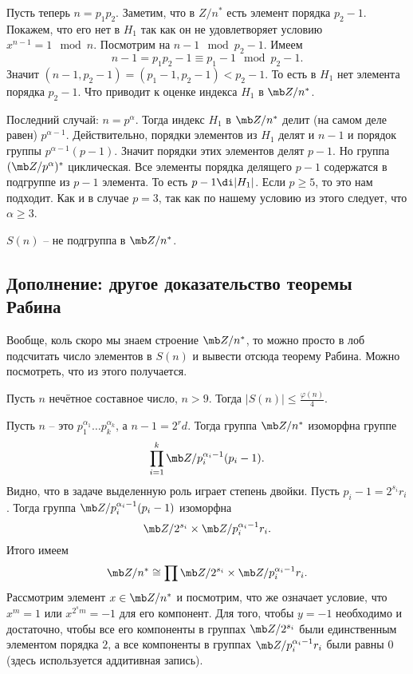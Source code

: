 Пусть теперь $n=p_1p_2$.  Заметим, что в $Z/n^*$ есть элемент порядка $p_2-1$. Покажем, что его нет в $H_1$ так как он не удовлетворяет условию $x^{n-1}=1 \mod n$. Посмотрим на $n-1 \mod p_2-1$. Имеем $$n-1=p_1p_2-1\equiv p_1-1 \mod p_2-1.$$
Значит $(n-1,p_2-1)=(p_1-1,p_2-1)<p_2-1$. То есть в $H_1$ нет элемента порядка $p_2-1$. Что приводит к оценке индекса $H_1$ в $\mb Z/n^*$.

Последний случай: $n=p^{\alpha}$. Тогда индекс $H_1$ в $\mb Z/n^*$  делит (на самом деле равен) $p^{\alpha-1}$. Действительно, порядки элементов из $H_1$ делят и $n-1$ и порядок группы $p^{\alpha-1}(p-1)$. Значит порядки этих элементов делят $p-1$. Но группа $(\mb Z/p^{\alpha})^*$ циклическая. Все элементы порядка делящего $p-1$ содержатся в подгруппе из $p-1$ элемента. То есть $p-1 \di |H_1|$.    Если $p\geq 5$, то это нам подходит. Как и в случае  $p=3$, так как по нашему условию из этого следует, что $\alpha\geq 3$.

\endproof


\upr $S(n)$ -- не подгруппа в $\mb Z/n^*$.
\eupr

\subsection{Дополнение: другое доказательство теоремы Рабина}

Вообще, коль скоро мы знаем строение $\mb Z/n^*$, то можно просто в лоб подсчитать число элементов в $S(n)$ и вывести отсюда теорему Рабина. Можно посмотреть, что из этого получается.

\begin{thmm}[Рабин] Пусть $n$ нечётное составное число,  $n>9$. Тогда $|S(n)|\leq \frac{\varphi(n)}{4}$.
\end{thmm}
\proof Пусть $n$ -- это $p_1^{\alpha_1}\dots p_k^{\alpha_k}$, а $n-1=2^rd$. Тогда группа $\mb Z/n^*$ изоморфна группе
$$ \prod_{i=1}^k \mb Z/p_i^{\alpha_i-1}(p_i -1).$$
Видно, что в задаче выделенную роль играет степень двойки. Пусть $p_i-1=2^{s_i}r_i$. Тогда группа $\mb Z/p_i^{\alpha_i-1}(p_i -1)$ изоморфна 
$$\mb Z/2^{s_i}\times \mb Z/p_i^{\alpha_i-1}r_i.$$
Итого имеем 
$$\mb Z/n^*\cong \prod \mb Z/2^{s_i} \times \mb Z/p_i^{\alpha_i-1}r_i.$$ 
Рассмотрим элемент $x\in \mb Z/n^*$ и посмотрим, что же означает условие, что $x^m=1$ или $x^{2^sm}=-1$ для его компонент. 
Для того, чтобы $y=-1$ необходимо и достаточно, чтобы все его компоненты в группах $\mb Z/2^{s_i}$ были единственным элементом порядка $2$, а все компоненты в группах $\mb Z/p_i^{\alpha_i-1}r_i$ были равны 0 (здесь используется аддитивная запись).

